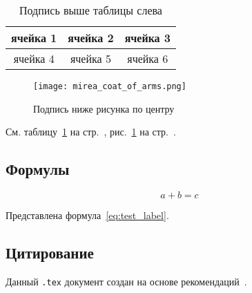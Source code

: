 \documentclass[14pt, a4paper, titlepage]{extarticle}
\begin{document}
\begin{table}[htb]
    \caption{Подпись выше таблицы слева}
    \begin{tabular}{ |c|c|c| } 
        \hline
        ячейка 1 & ячейка 2 & ячейка 3 \\ \hline
        ячейка 4 & ячейка 5 & ячейка 6 \\ \hline
    \end{tabular}
    \label{tab:test_label}
\end{table}
 
\begin{figure}[htb]
    \centering
    \texttt{[image: mirea\_coat\_of\_arms.png]}
    \caption{Подпись ниже рисунка по центру}
    \label{fig:test_label}
\end{figure}
 
См. таблицу~\ref{tab:test_label} на стр.~\pageref{tab:test_label}, рис.~\ref{fig:test_label} на стр.~\pageref{fig:test_label}.

\subsection{Формулы}

\begin{equation}\label{eq:test_label}
    a+b=c
\end{equation}

Представлена формула~\ref{eq:test_label}.

\subsection{Цитирование}

Данный \verb".tex" документ создан на основе рекомендаций~\parencite{bib:recomendations}.

\clearpage
{}
\printbibliography[title={Список использованных источников}]
\end{document}
